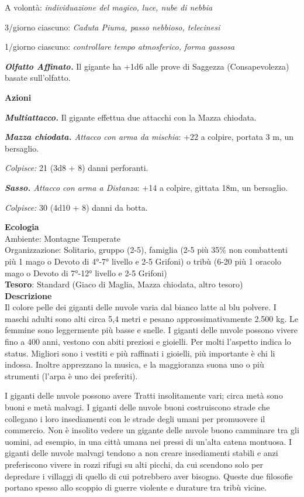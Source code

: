 \begin{multicols}{2}
A volontà: \textit{individuazione del magico, luce, nube di nebbia}

3/giorno ciascuno: \textit{Caduta Piuma, passo nebbioso, telecinesi}

1/giorno ciascuno: \textit{controllare tempo atmosferico, forma gassosa}

\textit{\textbf{Olfatto Affinato.}} Il gigante ha +1d6 alle prove di Saggezza (Consapevolezza) basate sull'olfatto.

\textbf{Azioni}

\textit{\textbf{Multiattacco.}} Il gigante effettua due attacchi con la Mazza chiodata.

\textit{\textbf{Mazza chiodata.} Attacco con arma da mischia}: +22 a colpire, portata 3 m, un bersaglio.

\textit{Colpisce:} 21 (3d8 + 8) danni perforanti.

\textit{\textbf{Sasso.} Attacco con arma a Distanza}: +14 a colpire, gittata 18m, un bersaglio.

\textit{Colpisce:} 30 (4d10 + 8) danni da botta.

\textbf{Ecologia}\\
Ambiente: Montagne Temperate\\
Organizzazione: Solitario, gruppo (2-5), famiglia (2-5 più 35\% non combattenti più 1 mago o Devoto di 4°-7° livello e 2-5 Grifoni) o tribù (6-20 più 1 oracolo mago o Devoto di 7°-12° livello e 2-5 Grifoni)\\
\textbf{Tesoro}: Standard (Giaco di Maglia, Mazza chiodata, altro tesoro)\\
\textbf{Descrizione}\\
Il colore pelle dei giganti delle nuvole varia dal bianco latte al blu polvere. I maschi adulti sono alti circa 5,4 metri e pesano approssimativamente 2.500 kg. Le femmine sono leggermente più basse e snelle. I giganti delle nuvole possono vivere fino a 400 anni, vestono con abiti preziosi e gioielli. Per molti l'aspetto indica lo status. Migliori sono i vestiti e più raffinati i gioielli, più importante è chi li indossa. Inoltre apprezzano la musica, e la maggioranza suona uno o più strumenti (l'arpa è uno dei preferiti).

I giganti delle nuvole possono avere Tratti insolitamente vari; circa metà sono buoni e metà malvagi. I giganti delle nuvole buoni costruiscono strade che collegano i loro insediamenti con le strade degli umani per promuovere il commercio. Non è insolito vedere un gigante delle nuvole buono camminare tra gli uomini, ad esempio, in una città umana nei pressi di un'alta catena montuosa. I giganti delle nuvole malvagi tendono a non creare insediamenti stabili e anzi preferiscono vivere in rozzi rifugi su alti picchi, da cui scendono solo per depredare i villaggi di quello di cui potrebbero aver bisogno. Queste due filosofie portano spesso allo scoppio di guerre violente e durature tra tribù vicine.


\end{multicols}
